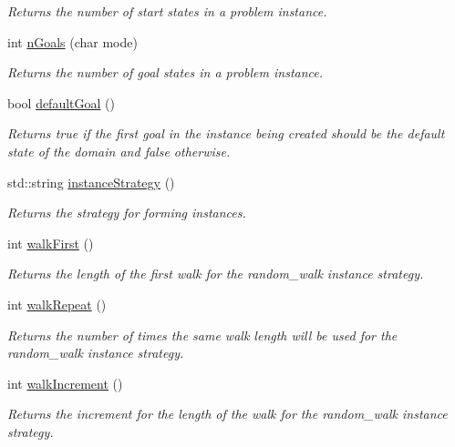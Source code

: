 \begin{DoxyCompactItemize}
\begin{DoxyCompactList}\small\item\em Returns the number of start states in a problem instance. \end{DoxyCompactList}\item 
int \hyperlink{structslb_1_1core_1_1commandLine_1_1CommandLine_a062e26ee110941ffbe598f13313b758c}{n\+Goals} (char mode)
\begin{DoxyCompactList}\small\item\em Returns the number of goal states in a problem instance. \end{DoxyCompactList}\item 
bool \hyperlink{structslb_1_1core_1_1commandLine_1_1CommandLine_a8f2cd242e85739a4aef2733755811fa7}{default\+Goal} ()
\begin{DoxyCompactList}\small\item\em Returns {\ttfamily true} if the first goal in the instance being created should be the default state of the domain and {\ttfamily false} otherwise. \end{DoxyCompactList}\item 
std\+::string \hyperlink{structslb_1_1core_1_1commandLine_1_1CommandLine_a4bbd10e591ae2335ac175b21e00f321d}{instance\+Strategy} ()
\begin{DoxyCompactList}\small\item\em Returns the strategy for forming instances. \end{DoxyCompactList}\item 
int \hyperlink{structslb_1_1core_1_1commandLine_1_1CommandLine_a4fad701ebf3b50c128e9c354b3f85989}{walk\+First} ()
\begin{DoxyCompactList}\small\item\em Returns the length of the first walk for the random\+\_\+walk instance strategy. \end{DoxyCompactList}\item 
int \hyperlink{structslb_1_1core_1_1commandLine_1_1CommandLine_a3b9c1d60c8675502ae70dd9d912f7450}{walk\+Repeat} ()
\begin{DoxyCompactList}\small\item\em Returns the number of times the same walk length will be used for the random\+\_\+walk instance strategy. \end{DoxyCompactList}\item 
int \hyperlink{structslb_1_1core_1_1commandLine_1_1CommandLine_a57761e4fb47868c5d325d72c23286ad6}{walk\+Increment} ()
\begin{DoxyCompactList}\small\item\em Returns the increment for the length of the walk for the random\+\_\+walk instance strategy. \end{DoxyCompactList}\item 

\end{DoxyCompactItemize}
